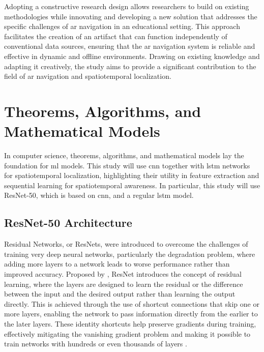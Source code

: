 \begin{refsection}
Adopting a constructive research design allows researchers to build on existing methodologies while innovating and developing a new solution that addresses the specific challenges of \gls{ar} navigation in an educational setting. This approach facilitates the creation of an artifact that can function independently of conventional data sources, ensuring that the \gls{ar} navigation system is reliable and effective in dynamic and offline environments. Drawing on existing knowledge and adapting it creatively, the study aims to provide a significant contribution to the field of \gls{ar} navigation and spatiotemporal localization.

\section{Theorems, Algorithms, and Mathematical Models}

In computer science, theorems, algorithms, and mathematical models lay the foundation for \gls{ml} models. This study will use \gls{cnn} together with \gls{lstm} networks for spatiotemporal localization, highlighting their utility in feature extraction and sequential learning for spatiotemporal awareness. In particular, this study will use ResNet-50, which is based on \gls{cnn}, and a regular \gls{lstm} model.

\subsection{ResNet-50 Architecture}

Residual Networks, or ResNets, were introduced to overcome the challenges of training very deep neural networks, particularly the degradation problem, where adding more layers to a network leads to worse performance rather than improved accuracy. Proposed by \citeauthor{he2015deepresiduallearningimage} \citeyear{he2015deepresiduallearningimage}, ResNet introduces the concept of residual learning, where the layers are designed to learn the residual or the difference between the input and the desired output rather than learning the output directly. This is achieved through the use of shortcut connections that skip one or more layers, enabling the network to pass information directly from the earlier to the later layers. These identity shortcuts help preserve gradients during training, effectively mitigating the vanishing gradient problem and making it possible to train networks with hundreds or even thousands of layers \cite{he2015deepresiduallearningimage}.


\end{refsection}

